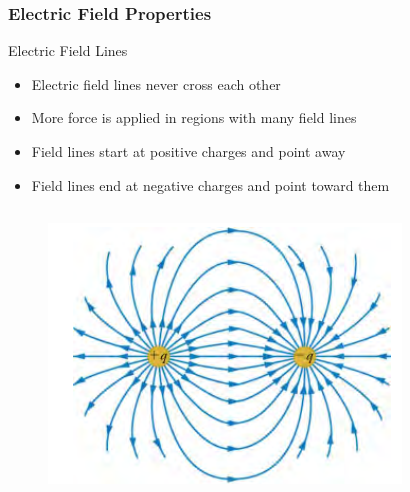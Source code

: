 \documentclass{beamer}
\begin{document}
\begin{frame}
    \frametitle{Electric Field Properties}
    \begin{block}{Electric Field Lines}
        \begin{itemize}
            \item Electric field lines never cross each other
            \item More force is applied in regions with many field lines
            \item Field lines start at positive charges and point away
            \item Field lines end at negative charges and point toward them
        \end{itemize}
    \end{block}
    
    \begin{columns}
        \begin{alertblock}{  1}
            \begin{figure}
                \centering
                \includegraphics[width=1\linewidth]{opppfeldlins.png}
            \end{figure}
        \end{alertblock}
        

\end{columns}
\end{frame}
\end{document}
